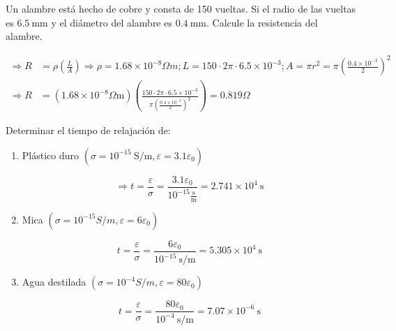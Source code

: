 \begin{problema}
    Un alambre está hecho de cobre y consta de 150 vueltas. Si el radio de las vueltas es $6.5 \mathrm{~mm}$ y el diámetro del alambre es $0.4 \mathrm{~mm}$. Calcule la resistencia del alambre.
    \begin{sol}
        
$$
\begin{aligned}
\Rightarrow R & =\rho\left(\frac{L}{A}\right) \Rightarrow \rho=1.68 \times 10^{-8} \Omega m ; L=150\cdot 2\pi \cdot 6.5\times 10^{-3}; A =\pi r^{2}=\pi\left(\frac{0.4 \times 10^{-3}}{2}\right)^{2} \\
\Rightarrow R & =\left(1.68 \times 10^{-8} \Omega \mathrm{m}\right)\left(\frac{150 \cdot 2 \pi \cdot 6.5 \times 10^{-3}}{\pi\left(\frac{0.4 \times 10^{-3}}{2}\right)^{2}}\right)=0.819 \Omega
\end{aligned}
$$

    \end{sol}

\end{problema}

\begin{problema}
    Determinar el tiempo de relajación de:
    \begin{enumerate}
        \item Plástico duro $\left(\sigma=10^{-15} \mathrm{~S} / \mathrm{m}, \varepsilon=3.1 \varepsilon_{0}\right)$
        \begin{sol}
            
$$
\Rightarrow t=\frac{\varepsilon}{\sigma}=\frac{3.1 \varepsilon_{0}}{10^{-15} \frac{\mathrm{s}}{\mathrm{m}}}=2.741 \times 10^{4} \mathrm{~s} 
$$
        \end{sol}
        \item Mica $\left(\sigma=10^{-15} S / m, \varepsilon=6 \varepsilon_{0}\right)$
        \begin{sol}
            $$
t=\frac{\varepsilon}{\sigma}=\frac{6 \varepsilon_{0}}{10^{-15} \mathrm{~s} / \mathrm{m}}=5.305 \times 10^4 \mathrm{~s}
$$
        \end{sol}
        \item Agua destilada $\left(\sigma=10^{-4} S / m, \varepsilon=80 \varepsilon_{0}\right)$ 
        \begin{sol}
            $$
t=\frac{\varepsilon}{\sigma}=\frac{80 \varepsilon_{0}}{10^{-4} \mathrm{~s} / \mathrm{m}}=7.07 \times 10^{-6} \mathrm{~s}
$$
        \end{sol}
    \end{enumerate}


\end{problema}

